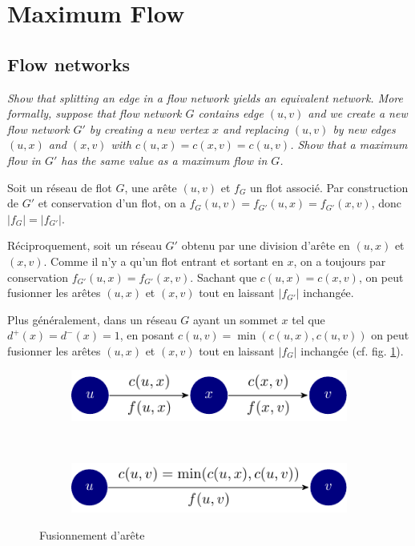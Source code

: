 \section{Maximum Flow}
\subsection{Flow networks}
\label{sub:flow_networks}

\begin{description}
 \textit{Show that splitting an edge in a flow network yields an equivalent network. More formally, suppose that flow network $G$ contains edge $(u,v)$ and we create a new flow network $G'$ by creating a new vertex $x$ and replacing $(u,v)$ by new edges $(u,x)$ and $(x,v)$ with $c(u,x) = c(x,v) = c(u,v)$. Show that a maximum flow in $G'$ has the same value as a maximum flow in $G$.}

\begin{ex}
  Soit un réseau de flot $G$, une arête $(u,v)$ et $f_G$ un flot associé. Par construction de $G'$ et conservation d'un flot, on a $f_G(u,v) = f_{G'}(u,x) = f_{G'}(x,v)$, donc $|f_G| = |f_{G'}|$.

  Réciproquement, soit un réseau $G'$ obtenu par une division d'arête en $(u,x)$ et $(x,v)$. Comme il n'y a qu'un flot entrant et sortant en $x$, on a toujours par conservation $f_{G'}(u,x) = f_{G'}(x,v)$. Sachant que $c(u,x) = c(x,v)$, on peut fusionner les arêtes $(u,x)$ et $(x,v)$ tout en laissant $|f_{G'}|$ inchangée.
  
Plus généralement, dans un réseau $G$ ayant un sommet $x$ tel que $d^+(x) = d^-(x) = 1$, en posant $c(u,v) = \min(c(u,x),c(u,v))$ on peut fusionner les arêtes $(u,x)$ et $(x,v)$ tout en laissant $|f_{G}|$ inchangée (cf. fig. \ref{fig:edge-fusion}).

\begin{figure}[H]
\centering

\begin{subfigure}[t]{.45\textwidth}
\includegraphics{img/26_1-1/26_1-1_1.pdf}
\end{subfigure}
~
\begin{subfigure}[t]{.45\textwidth}
\includegraphics{img/26_1-1/26_1-1_2.pdf}
\end{subfigure}
\caption{Fusionnement d'arête}
\label{fig:edge-fusion}
\end{figure}


\end{ex}
\end{description}
